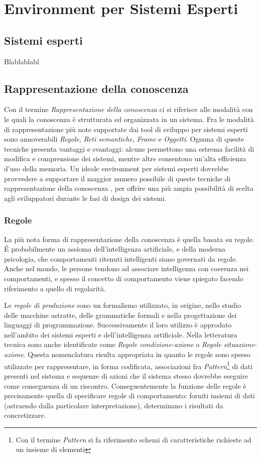 \chapter{Environment per Sistemi Esperti}



\section{Sistemi esperti}

Blablablabl

\section{Rappresentazione della conoscenza}
Con il termine \emph{Rappresentazione della conoscenza} ci si riferisce alle modalità con le quali la conoscenza è strutturata ed organizzata in un sistema. Fra le modalità di rappresentazione più note supportate dai tool di sviluppo per sistemi esperti sono annoverabili \emph{Regole}, \emph{Reti semantiche}, \emph{Frame} e \emph{Oggetti}. Ognuna di queste tecniche presenta vantaggi e svantaggi: alcune permettono una estrema facilità di modifica e comprensione dei sistemi, mentre altre consentono un'alta efficienza d'uso della memoria. Un ideale environment per sistemi esperti dovrebbe provvedere a supportare il maggior numero possibile di queste tecniche di rappresentazione della conoscenza \cite{development1993}, per offrire una più ampia possibilità di scelta agli sviluppatori durante le fasi di design dei sistemi.

\subsection{Regole}
La più nota forma di rappresentazione della conoscenza è quella basata su regole. \'E probabilmente un assioma dell'intelligenza artificiale, e della moderna psicologia, che comportamenti ritenuti intelligenti siano governati da regole. Anche nel mondo, le persone tendono ad associare intelligenza con coerenza nei comportamenti, e spesso il concetto di comportamento viene spiegato facendo riferimento a quello di regolarità. \cite{jackson1999}

Le \emph{regole di produzione} sono un formalismo utilizzato, in origine, nello studio delle macchine astratte, delle grammatiche formali e nella progettazione dei linguaggi di programmazione. Successivamente il loro utilizzo è approdato nell'ambito dei sistemi esperti e dell'intelligenza artificiale. Nella letteratura tecnica sono anche identificate come \emph{Regole condizione-azione} o \emph{Regole situazione-azione}. Questa nomenclatura risulta appropriata in quanto le regole sono spesso utilizzate per rappresentare, in forma codificata, associazioni fra \emph{Pattern}\footnote{Con il termine \emph{Pattern} si fa riferimento schemi di caratteristiche richieste ad un insieme di elementi} di dati presenti nel sistema e sequenze di azioni che il sistema stesso dovrebbe eseguire come conseguenza di un riscontro. Conseguentemente la funzione delle regole è precisamente quella di specificare regole di comportamento: forniti insiemi di dati (astraendo dalla particolare interpretazione), determinano i risultati da concretizzare.

